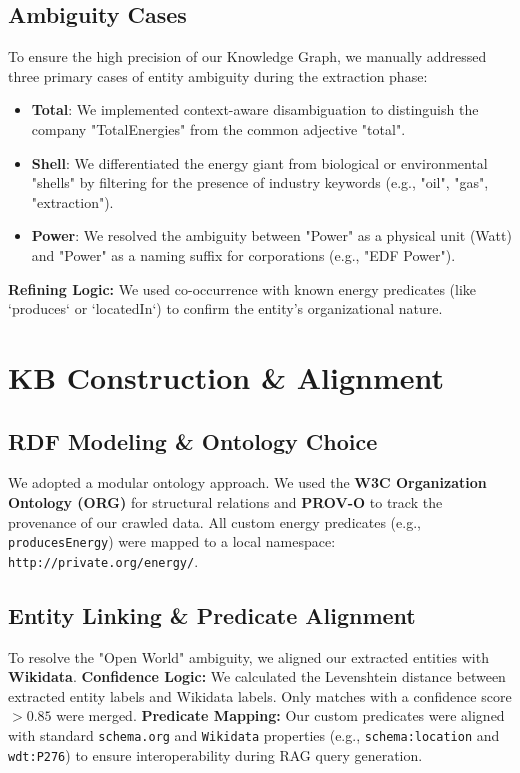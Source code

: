 \documentclass[11pt,a4paper]{article}
\begin{document}
\subsection{Ambiguity Cases}
To ensure the high precision of our Knowledge Graph, we manually addressed three primary cases of entity ambiguity during the extraction phase:
\begin{itemize}
    \item \textbf{Total}: We implemented context-aware disambiguation to distinguish the company "TotalEnergies" from the common adjective "total". 
    \item \textbf{Shell}: We differentiated the energy giant from biological or environmental "shells" by filtering for the presence of industry keywords (e.g., "oil", "gas", "extraction").
    \item \textbf{Power}: We resolved the ambiguity between "Power" as a physical unit (Watt) and "Power" as a naming suffix for corporations (e.g., "EDF Power").
\end{itemize}
\textbf{Refining Logic:} We used co-occurrence with known energy predicates (like `produces` or `locatedIn`) to confirm the entity's organizational nature.

\section{KB Construction \& Alignment}
\subsection{RDF Modeling & Ontology Choice}
We adopted a modular ontology approach. We used the \textbf{W3C Organization Ontology (ORG)} for structural relations and \textbf{PROV-O} to track the provenance of our crawled data. All custom energy predicates (e.g., \texttt{producesEnergy}) were mapped to a local namespace: \texttt{http://private.org/energy/}.

\subsection{Entity Linking \& Predicate Alignment}
To resolve the "Open World" ambiguity, we aligned our extracted entities with \textbf{Wikidata}.
\textbf{Confidence Logic:} We calculated the Levenshtein distance between extracted entity labels and Wikidata labels. Only matches with a confidence score $> 0.85$ were merged.
\textbf{Predicate Mapping:} Our custom predicates were aligned with standard \texttt{schema.org} and \texttt{Wikidata} properties (e.g., \texttt{schema:location} and \texttt{wdt:P276}) to ensure interoperability during RAG query generation.
\end{document}
